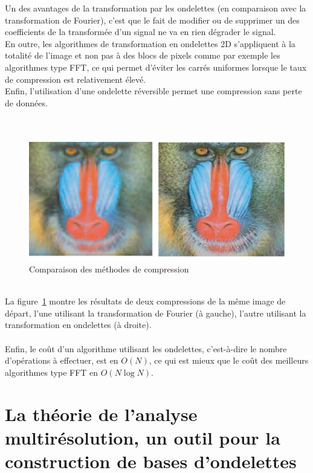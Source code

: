 \documentclass{article}
\begin{document}
Un des avantages de la transformation par les ondelettes (en comparaison avec la transformation de Fourier), c'est que le fait de modifier ou de supprimer un des coefficients de la transformée d'un signal ne va en rien dégrader le signal. \\
En outre, les algorithmes de transformation en ondelettes 2D s'appliquent à la totalité de l'image et non pas à des blocs de pixels comme par exemple les algorithmes type FFT, ce qui permet d'éviter les carrés uniformes lorsque le taux de compression est relativement élevé. \\
Enfin, l'utilisation d'une ondelette réversible permet une compression sans perte de données. \\ \\ \\
\begin{figure}[!h]
\centering
\includegraphics[scale=0.4]{images/comparaison.jpg}
\caption{Comparaison des méthodes de compression}
\label{comp}
\end{figure} \\
La figure~\ref{comp} montre les résultats de deux compressions de la même image de départ, l'une utilisant la transformation de Fourier (à gauche), l'autre utilisant la transformation en ondelettes (à droite). \\ \\
Enfin, le coût d'un algorithme utilisant les ondelettes, c'est-à-dire le nombre d'opérations à effectuer, est en $O(N)$, ce qui est mieux que le coût des meilleurs algorithmes type FFT en $O(N\log N)$.



\section{La théorie de l'analyse multirésolution, un outil pour la construction de bases d'ondelettes}
\end{document}
